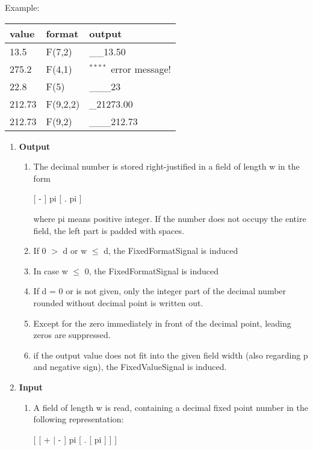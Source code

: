 \begin{removed}
Example:

\begin{tabular}{lll}
value  & format   & output \\ \hline
13.5   & F(7,2)   & \_\_13.50  \\
275.2  & F(4,1)   & $^{****}$ \x \x error message! \\
22.8   & F(5)     & \_\_\_23 \\
212.73 & F(9,2,2) & \_21273.00 \\
212.73 & F(9,2)   & \_\_\_212.73
\end{tabular}
\end{removed}

\begin{added}
\begin{enumerate}
\item {\bf Output}
\begin{enumerate}
\item The decimal number is stored right-justified in a field of length
w in the form

[ - ] pi [ . pi ]

where pi means positive integer. If the number does not occupy the
entire field, the left part is padded with spaces.
\item If 0 $>$ d or w $\leq$ d, the FixedFormatSignal is induced
\item In case w $\leq$ 0, the FixedFormatSignal is induced
\item If d = 0 or is not given, only the integer part of the decimal
number rounded without decimal point is written out.
\item Except for the zero immediately in front of the decimal point,
leading zeros are suppressed.
\item if the output value does not fit into the given field width 
   (also regarding p and negative sign), the FixedValueSignal is induced.
\end{enumerate}
\item {\bf Input}
\begin{enumerate}
\item A field of length w is read, containing a decimal fixed point
number in the following representation:

[ [ + $\mid$ - ] pi [ . [ pi ] ] ]


\end{enumerate}
\end{enumerate}
\end{added}
